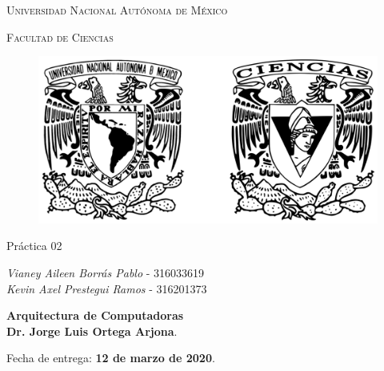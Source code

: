\documentclass[11pt,letterpaper]{article}
\begin{document}
	
	\begin{titlepage}
		\centering
		
		{\scshape\LARGE Universidad Nacional Autónoma de México \par}
		
		\vspace{1cm}
		{\scshape\Large Facultad de Ciencias\par}
		\vspace{1.5cm}
		
		\begin{figure}[h]
			\centering
			\includegraphics[scale=0.15]{logo.png}
		\end{figure}
		
		\vspace{.8 cm}
		
		{\LARGE Práctica 02 \par}
		
		\vspace{0.5cm}
		\large{\itshape{Vianey Aileen Borrás Pablo}} \small{ - 316033619} \\ \vspace{0.3cm}
		\large{\itshape{Kevin Axel Prestegui Ramos}} \small{ - 316201373} \\ \vspace{0.3cm}
		\vfill
		
		\textbf{Arquitectura de Computadoras}\\
		\textbf{Dr. Jorge Luis Ortega Arjona}. \par
		\vspace{0.5cm}
		Fecha de entrega: \textbf{12 de marzo de 2020}.
	\end{titlepage}
\end{document}
